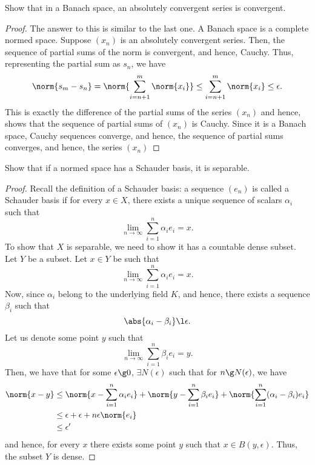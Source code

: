 \begin{question}
    Show that in a Banach space, an absolutely convergent series is convergent.
    \label{section2.3-9}
\end{question}
\begin{proof}
    The answer to this is similar to the last one. A Banach space is a complete normed space. Suppose $(x_n)$ is an absolutely convergent series. Then, the sequence of partial sums of the norm is convergent, and hence, Cauchy. Thus, representing the partial sum as $s_n$, we have
    \[\norm{s_m - s_n} = \norm{\sum_{i=n+1}^m \norm{x_i}} \leq \sum_{i=n+1}^m \norm{x_i} \leq \epsilon.\]
    This is exactly the difference of the partial sums of the series $(x_n)$ and hence, shows that the sequence of partial sums of $(x_n)$ is Cauchy. Since it is a Banach space, Cauchy sequences converge, and hence, the sequence of partial sums converges, and hence, the series $(x_n)$ 
\end{proof}

\begin{question}
    Show that if a normed space has a Schauder basis, it is separable.
    \label{section2.3-10}
\end{question}
\begin{proof}
    Recall the definition of a Schauder basis: a sequence $(e_n)$ is called a Schauder basis if for every $x \in X$, there exists a unique sequence of scalars $\alpha_i$ such that
    \[\lim_{n \rightarrow \infty} \sum_{i=1}^n \alpha_i e_i = x.\]
    To show that $X$ is separable, we need to show it has a countable dense subset. Let $Y$ be a subset. Let $x \in Y$ be such that
    \[\lim_{n \rightarrow \infty} \sum_{i=1}^n \alpha_i e_i = x.\]
    Now, since $\alpha_i$ belong to the underlying field $K$, and hence, there exists a sequence $\beta_i$ such that
    \[\abs{\alpha_i - \beta_i} \l \epsilon.\]
    Let us denote some point $y$ such that
    \[\lim_{n \rightarrow \infty} \sum_{i=1}^n \beta_i e_i = y.\]
    Then, we have that for some $\epsilon \g 0$, $\exists N(\epsilon)$ such that for $n \g N(\epsilon)$, we have
    \begin{align*}
        \norm{x - y} &\leq \norm{x - \sum_{i=1}^n \alpha_i e_i} + \norm{y - \sum_{i=1}^n \beta_i e_i} + \norm{\sum_{i=1}^n (\alpha_i - \beta_i) e_i}
        \\
        &\leq \epsilon + \epsilon + n\epsilon \norm{e_i} 
        \\
        &\leq \epsilon^\prime
    \end{align*}
    and hence, for every $x$ there exists some point $y$ such that $x \in B(y , \epsilon)$. Thus, the subset $Y$ is dense.
\end{proof}

